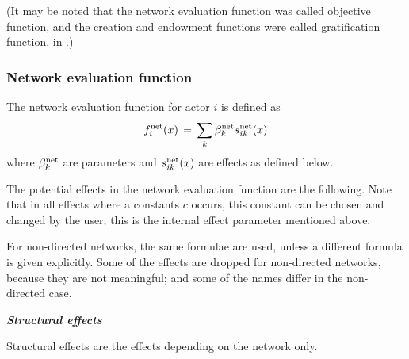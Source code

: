 \documentclass[a4paper,fleqn,11pt]{article}
\newcommand{\+}{\, + \,}
\begin{document}
(It may be noted that the network evaluation function
was called objective function,
and the creation and endowment functions were called gratification function,
in \citet{Snijders01}.)

\subsubsection{Network evaluation function}
\label{S_f}

The network evaluation function for actor $i$ is defined as
\begin{equation}
f^{\rm net}_i(x) \, = \,
              \sum_k \beta^{\rm net}_k s^{\rm net}_{ik}(x)   \label{f_net}
\end{equation}
where $\beta^{\rm net}_k$ are parameters and $s^{\rm net}_{ik}(x)$
are effects as defined below.

The potential effects in the \hypertarget{T_objective}{network
evaluation function}
are the following. Note that in all
effects where a constants $c$ occurs, this constant can be chosen
and changed by the user;
this is the internal effect parameter mentioned above.

For non-directed networks, the same formulae are used,
unless a different formula is given explicitly.
Some of the effects are dropped for non-directed networks, because
they are not meaningful; and some of the names differ in the
non-directed case.
\medskip

\noindent
\textbf{\emph{Structural effects}}
\medskip

\noindent
Structural effects are the effects depending on the network only.
\end{document}
